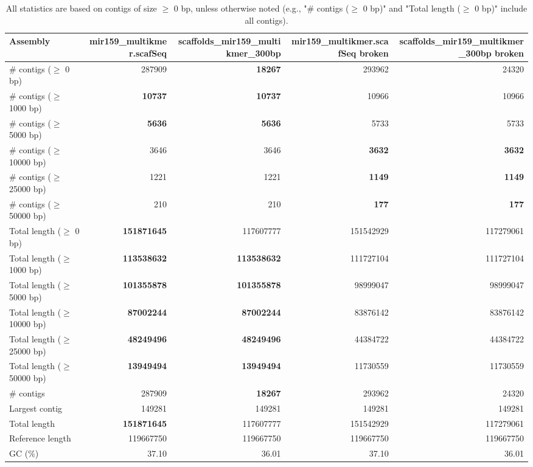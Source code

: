 \documentclass[12pt,a4paper]{article}
\begin{document}
\begin{table}[ht]
\begin{center}
\caption{All statistics are based on contigs of size $\geq$ 0 bp, unless otherwise noted (e.g., "\# contigs ($\geq$ 0 bp)" and "Total length ($\geq$ 0 bp)" include all contigs).}
\begin{tabular}{|l*{4}{|r}|}
\hline
Assembly & mir159\_multikmer.scafSeq & scaffolds\_mir159\_multikmer\_300bp & mir159\_multikmer.scafSeq broken & scaffolds\_mir159\_multikmer\_300bp broken \\ \hline
\# contigs ($\geq$ 0 bp) & 287909 & {\bf 18267} & 293962 & 24320 \\ \hline
\# contigs ($\geq$ 1000 bp) & {\bf 10737} & {\bf 10737} & 10966 & 10966 \\ \hline
\# contigs ($\geq$ 5000 bp) & {\bf 5636} & {\bf 5636} & 5733 & 5733 \\ \hline
\# contigs ($\geq$ 10000 bp) & 3646 & 3646 & {\bf 3632} & {\bf 3632} \\ \hline
\# contigs ($\geq$ 25000 bp) & 1221 & 1221 & {\bf 1149} & {\bf 1149} \\ \hline
\# contigs ($\geq$ 50000 bp) & 210 & 210 & {\bf 177} & {\bf 177} \\ \hline
Total length ($\geq$ 0 bp) & {\bf 151871645} & 117607777 & 151542929 & 117279061 \\ \hline
Total length ($\geq$ 1000 bp) & {\bf 113538632} & {\bf 113538632} & 111727104 & 111727104 \\ \hline
Total length ($\geq$ 5000 bp) & {\bf 101355878} & {\bf 101355878} & 98999047 & 98999047 \\ \hline
Total length ($\geq$ 10000 bp) & {\bf 87002244} & {\bf 87002244} & 83876142 & 83876142 \\ \hline
Total length ($\geq$ 25000 bp) & {\bf 48249496} & {\bf 48249496} & 44384722 & 44384722 \\ \hline
Total length ($\geq$ 50000 bp) & {\bf 13949494} & {\bf 13949494} & 11730559 & 11730559 \\ \hline
\# contigs & 287909 & {\bf 18267} & 293962 & 24320 \\ \hline
Largest contig & 149281 & 149281 & 149281 & 149281 \\ \hline
Total length & {\bf 151871645} & 117607777 & 151542929 & 117279061 \\ \hline
Reference length & 119667750 & 119667750 & 119667750 & 119667750 \\ \hline
GC (\%) & 37.10 & 36.01 & 37.10 & 36.01 \\ \hline

\end{tabular}
\end{center}
\end{table}
\end{document}
